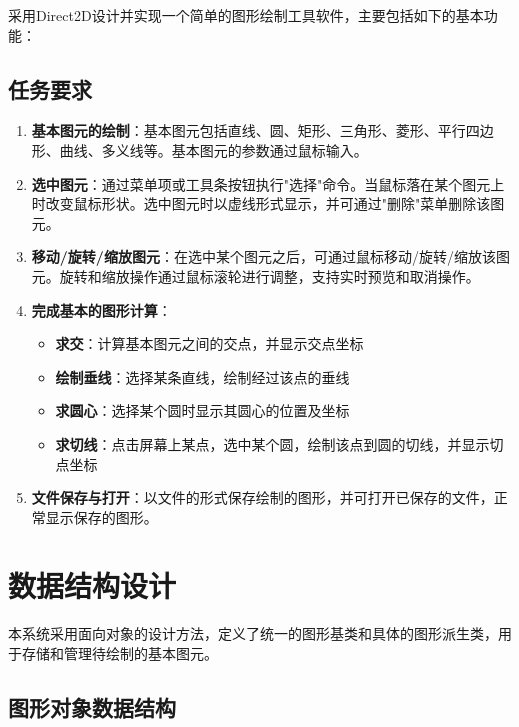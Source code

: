 \documentclass[12pt,a4paper]{article}
\begin{document}
\begin{tcolorbox}
采用Direct2D设计并实现一个简单的图形绘制工具软件，主要包括如下的基本功能：

\subsection*{任务要求}

\begin{enumerate}
    \item \textbf{基本图元的绘制}：基本图元包括直线、圆、矩形、三角形、菱形、平行四边形、曲线、多义线等。基本图元的参数通过鼠标输入。
    
    \item \textbf{选中图元}：通过菜单项或工具条按钮执行"选择"命令。当鼠标落在某个图元上时改变鼠标形状。选中图元时以虚线形式显示，并可通过"删除"菜单删除该图元。
    
    \item \textbf{移动/旋转/缩放图元}：在选中某个图元之后，可通过鼠标移动/旋转/缩放该图元。旋转和缩放操作通过鼠标滚轮进行调整，支持实时预览和取消操作。
    
    \item \textbf{完成基本的图形计算}：
    \begin{itemize}
        \item \textbf{求交}：计算基本图元之间的交点，并显示交点坐标
        \item \textbf{绘制垂线}：选择某条直线，绘制经过该点的垂线
        \item \textbf{求圆心}：选择某个圆时显示其圆心的位置及坐标
        \item \textbf{求切线}：点击屏幕上某点，选中某个圆，绘制该点到圆的切线，并显示切点坐标
    \end{itemize}
    
    \item \textbf{文件保存与打开}：以文件的形式保存绘制的图形，并可打开已保存的文件，正常显示保存的图形。
    
\end{enumerate}
\end{tcolorbox}


\section{数据结构设计}

本系统采用面向对象的设计方法，定义了统一的图形基类和具体的图形派生类，用于存储和管理待绘制的基本图元。

\subsection{图形对象数据结构}
\end{document}
